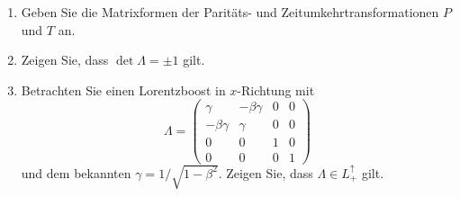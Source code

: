 \documentclass{exercise}
\begin{document}
\begin{enumerate}
    \item Geben Sie die Matrixformen der Paritäts- und Zeitumkehrtransformationen $P$ und $T$ an.
    

    \item Zeigen Sie, dass $\det \Lambda = \pm 1$ gilt. 

    \item Betrachten Sie einen Lorentzboost in $x$-Richtung mit
    \begin{equation}
        \label{eq:BoostsMatrix}
        \Lambda = \begin{pmatrix}
            \gamma & -\beta \gamma & 0 & 0 \\
            -\beta \gamma & \gamma & 0 & 0 \\
            0 & 0 & 1 & 0 \\
            0 & 0 & 0 & 1
        \end{pmatrix}
    \end{equation}
    und dem bekannten $\gamma = 1/\sqrt{1-\beta^2}$.
    Zeigen Sie, dass $\Lambda \in L_+^\uparrow$ gilt.


\end{enumerate}
\end{document}
